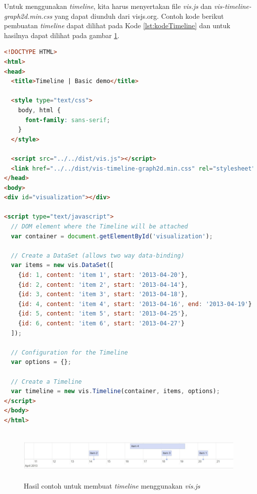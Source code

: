 Untuk menggunakan \textit{timeline}, kita harus menyertakan file \textit{vis.js} dan \textit{vis-timeline-graph2d.min.css} yang dapat diunduh dari visjs.org. Contoh kode berikut pembuatan \textit{timeline} dapat dilihat pada Kode \ref{lst:kodeTimeline} dan untuk hasilnya dapat dilihat pada gambar \ref{fig:gambarHasilTimeline}.

\begin{lstlisting}[language=HTML, caption=Contoh kode untuk membuat \textit{timeline} menggunakan \textit{vis.js}\label{lst:kodeTimeline}]
<!DOCTYPE HTML>
<html>
<head>
  <title>Timeline | Basic demo</title>

  <style type="text/css">
    body, html {
      font-family: sans-serif;
    }
  </style>

  <script src="../../dist/vis.js"></script>
  <link href="../../dist/vis-timeline-graph2d.min.css" rel="stylesheet" type="text/css" />
</head>
<body>
<div id="visualization"></div>

<script type="text/javascript">
  // DOM element where the Timeline will be attached
  var container = document.getElementById('visualization');

  // Create a DataSet (allows two way data-binding)
  var items = new vis.DataSet([
    {id: 1, content: 'item 1', start: '2013-04-20'},
    {id: 2, content: 'item 2', start: '2013-04-14'},
    {id: 3, content: 'item 3', start: '2013-04-18'},
    {id: 4, content: 'item 4', start: '2013-04-16', end: '2013-04-19'},
    {id: 5, content: 'item 5', start: '2013-04-25'},
    {id: 6, content: 'item 6', start: '2013-04-27'}
  ]);

  // Configuration for the Timeline
  var options = {};

  // Create a Timeline
  var timeline = new vis.Timeline(container, items, options);
</script>
</body>
</html>
\end{lstlisting}

\begin{figure}[H]
    \centering
    \includegraphics[width=16.5cm, height=2.5cm]{Gambar/hasilTimeline.jpg}
    \caption{Hasil contoh untuk membuat \textit{timeline} menggunakan \textit{vis.js}}
    \label{fig:gambarHasilTimeline}
\end{figure}

